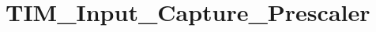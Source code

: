\hypertarget{group___t_i_m___input___capture___prescaler}{\section{T\-I\-M\-\_\-\-Input\-\_\-\-Capture\-\_\-\-Prescaler}
\label{group___t_i_m___input___capture___prescaler}
}
